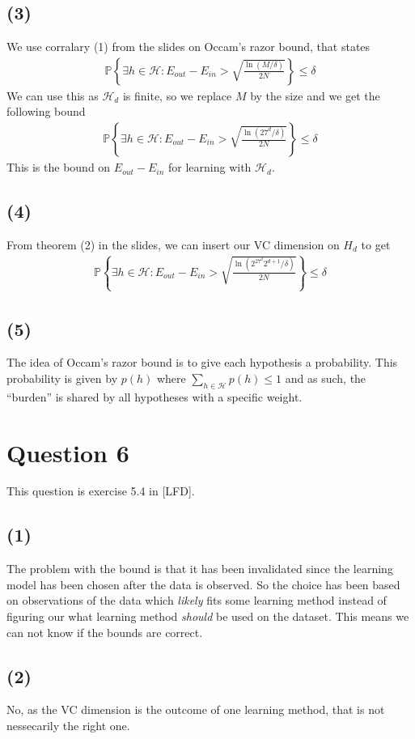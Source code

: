 \documentclass[a4paper]{article}
\begin{document}
\subsection*{(3)}
We use corralary (1) from the slides on Occam's razor bound, that states
\begin{align*}
\mathbb{P}\left\{\exists h\in \mathcal{H} : E_{out}-E_{in}> \sqrt{\frac{\ln(M/\delta)}{2N}}\right\}\leq \delta
\end{align*}
We can use this as $\mathcal{H}_d$ is finite, so we replace $M$ by the size and we get the following bound
\begin{align*}
\mathbb{P}\left\{\exists h\in \mathcal{H} : E_{out}-E_{in}> \sqrt{\frac{\ln(27^d/\delta)}{2N}}\right\}\leq \delta
\end{align*}
This is the bound on $E_{out}-E_{in}$ for learning with $\mathcal{H}_d$.

\subsection*{(4)}
From theorem (2) in the slides, we can insert our VC dimension on $H_{d}$ to get
\begin{align*}
\mathbb{P}\left\{\exists h\in \mathcal{H} : E_{out}-E_{in}> \sqrt{\frac{\ln\left(2^{27^d}2^{d+1}/\delta\right)}{2N}}\right\}\leq \delta
\end{align*}

\subsection*{(5)}
The idea of Occam's razor bound is to give each hypothesis a probability. This probability is given by $p(h)$ where $\sum_{h\in \mathcal{H}}p(h)\leq 1$ and as such, the ``burden'' is shared by all hypotheses with a specific weight.

\newpage
\section*{Question 6}
This question is exercise 5.4 in [LFD].
\subsection*{(1)}
The problem with the bound is that it has been invalidated since the learning model has been chosen after the data is observed. So the choice has been based on observations of the data which \textit{likely} fits some learning method instead of figuring our what learning method \textit{should} be used on the dataset. This means we can not know if the bounds are correct.

\subsection*{(2)}
No, as the VC dimension is the outcome of one learning method, that is not nessecarily the right one.
\end{document}
